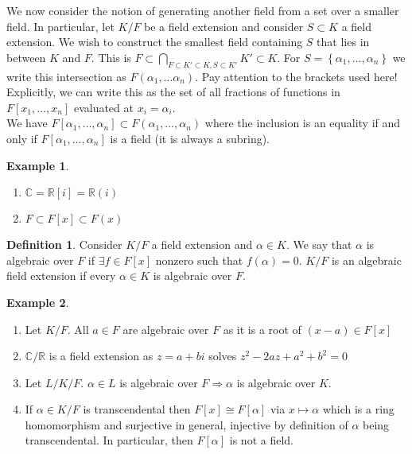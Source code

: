 \documentclass{article}
\newcommand\R{\ensuremath{\mathbb{R}}}
\newcommand\C{\ensuremath{\mathbb{C}}}
\theoremstyle{definition}
\newtheorem{definition}{Definition}[subsection]
\newtheorem{eg}{Example}[subsection]
\theoremstyle{remark}
\theoremstyle{plain}
\begin{document}
We now consider the notion of generating another field from a set over a smaller field. 
In particular, let \(K/F\) be a field extension and consider \(S\subset K\) a field extension. We wish to construct the smallest field
containing \(S\) that lies in between \(K\) and \(F\). This is \(F \subset \bigcap\limits_{F\subset K' \subset K, S \subset K'} K' \subset K\). 
For \(S = \left\{ \alpha_1, \ldots, \alpha_n \right\}\) we write this intersection as \(F(\alpha_1, \ldots \alpha_n)\). Pay attention to the brackets used here!
Explicitly, we can write this as the set of all fractions of functions in \(F[x_1, \ldots, x_n]\) evaluated at \(x_i = \alpha_i\).\\

We have \(F[\alpha_1, \ldots, \alpha_n] \subset F(\alpha_1, \ldots, \alpha_n)\) where the inclusion is an equality if and only if \(F[\alpha_1, \ldots, \alpha_n]\) is a field (it is always a subring).

\begin{eg}
    \begin{enumerate}
        \item \(\C = \R[i] = \R(i)\)
        \item \(F \subset F[x] \subset F(x)\)
    \end{enumerate}
\end{eg}

\begin{definition}
    Consider \(K/F\) a field extension and \(\alpha \in K\). We say that \(\alpha\) is algebraic over \(F\) if \(\exists f \in F[x]\) nonzero such that \(f(\alpha) = 0\).
    \(K/F\) is an algebraic field extension if every \(\alpha \in K\) is algebraic over \(F\).
\end{definition}

\begin{eg}
    \begin{enumerate}
        \item Let \(K/F\). All \(a \in F\) are algebraic over \(F\) as it is a root of \((x-a) \in F[x]\)
        \item \(\C/\R\) is a field extension as \(z = a+bi\) solves \(z^2 - 2az + a^2 + b^2 = 0\)
        \item Let \(L/K/F\). \(\alpha \in L\) is algebraic over \(F \Rightarrow \alpha\) is algebraic over \(K\).
        \item If \(\alpha \in K/F\) is transcendental then \(F[x] \cong F[\alpha]\) via \(x\mapsto \alpha\) which is a ring homomorphism and surjective in general, injective by definition of \(\alpha\)
        being transcendental. In particular, then \(F[\alpha]\) is not a field. 
    \end{enumerate}
    
\end{eg}
\end{document}
